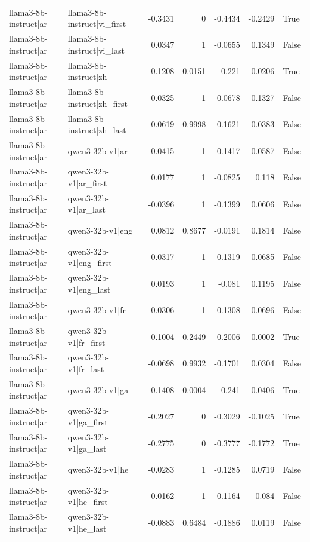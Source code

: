 \begin{table}
\begin{tabular}{l l r r r r l}
llama3-8b-instruct|ar & llama3-8b-instruct|vi_first & -0.3431 & 0 & -0.4434 & -0.2429 & True \\
llama3-8b-instruct|ar & llama3-8b-instruct|vi_last & 0.0347 & 1 & -0.0655 & 0.1349 & False \\
llama3-8b-instruct|ar & llama3-8b-instruct|zh & -0.1208 & 0.0151 & -0.221 & -0.0206 & True \\
llama3-8b-instruct|ar & llama3-8b-instruct|zh_first & 0.0325 & 1 & -0.0678 & 0.1327 & False \\
llama3-8b-instruct|ar & llama3-8b-instruct|zh_last & -0.0619 & 0.9998 & -0.1621 & 0.0383 & False \\
llama3-8b-instruct|ar & qwen3-32b-v1|ar & -0.0415 & 1 & -0.1417 & 0.0587 & False \\
llama3-8b-instruct|ar & qwen3-32b-v1|ar_first & 0.0177 & 1 & -0.0825 & 0.118 & False \\
llama3-8b-instruct|ar & qwen3-32b-v1|ar_last & -0.0396 & 1 & -0.1399 & 0.0606 & False \\
llama3-8b-instruct|ar & qwen3-32b-v1|eng & 0.0812 & 0.8677 & -0.0191 & 0.1814 & False \\
llama3-8b-instruct|ar & qwen3-32b-v1|eng_first & -0.0317 & 1 & -0.1319 & 0.0685 & False \\
llama3-8b-instruct|ar & qwen3-32b-v1|eng_last & 0.0193 & 1 & -0.081 & 0.1195 & False \\
llama3-8b-instruct|ar & qwen3-32b-v1|fr & -0.0306 & 1 & -0.1308 & 0.0696 & False \\
llama3-8b-instruct|ar & qwen3-32b-v1|fr_first & -0.1004 & 0.2449 & -0.2006 & -0.0002 & True \\
llama3-8b-instruct|ar & qwen3-32b-v1|fr_last & -0.0698 & 0.9932 & -0.1701 & 0.0304 & False \\
llama3-8b-instruct|ar & qwen3-32b-v1|ga & -0.1408 & 0.0004 & -0.241 & -0.0406 & True \\
llama3-8b-instruct|ar & qwen3-32b-v1|ga_first & -0.2027 & 0 & -0.3029 & -0.1025 & True \\
llama3-8b-instruct|ar & qwen3-32b-v1|ga_last & -0.2775 & 0 & -0.3777 & -0.1772 & True \\
llama3-8b-instruct|ar & qwen3-32b-v1|he & -0.0283 & 1 & -0.1285 & 0.0719 & False \\
llama3-8b-instruct|ar & qwen3-32b-v1|he_first & -0.0162 & 1 & -0.1164 & 0.084 & False \\
llama3-8b-instruct|ar & qwen3-32b-v1|he_last & -0.0883 & 0.6484 & -0.1886 & 0.0119 & False \\

\end{tabular}
\end{table}

